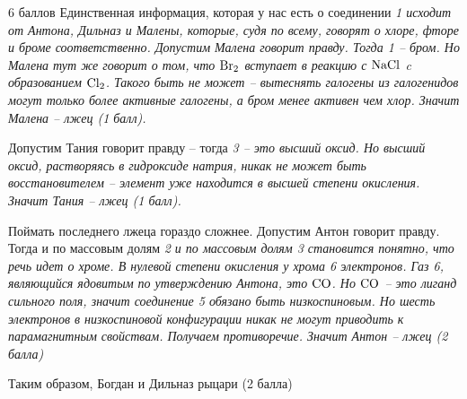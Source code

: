 


\begin{solbox}{6 баллов}
  Единственная информация, которая у нас есть о соединении \em{1} исходит от Антона, Дильназ и Малены, которые, судя по всему, говорят о хлоре, фторе и броме соответственно. Допустим Малена говорит правду. Тогда \em{1} – бром. Но Малена тут же говорит о том, что $\ce{Br2}$ вступает в реакцию с $\ce{NaCl}$ c образованием $\ce{Cl2}$. Такого быть не может – вытеснять галогены из галогенидов могут только более активные галогены, а бром менее активен чем хлор. Значит Малена – лжец (1 балл).

  Допустим Тания говорит правду – тогда \em{3} – это высший оксид. Но высший оксид, растворяясь в гидроксиде натрия, никак не может быть восстановителем – элемент уже находится в высшей степени окисления. Значит Тания – лжец (1 балл).

  Поймать последнего лжеца гораздо сложнее. Допустим Антон говорит правду. Тогда и по массовым долям \em{2} и по массовым долям \em{3} становится понятно, что речь идет о хроме. В нулевой степени окисления у хрома \em{6} электронов. Газ \em{6}, являющийся ядовитым по утверждению Антона, это $\ce{CO}$. Но $\ce{CO}$ – это лиганд сильного поля, значит соединение \em{5} обязано быть низкоспиновым. Но шесть электронов в низкоспиновой конфигурации никак не могут приводить к парамагнитным свойствам. Получаем противоречие. Значит Антон – лжец (2 балла)

  Таким образом, Богдан и Дильназ рыцари (2 балла)
\end{solbox}



